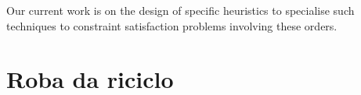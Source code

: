 \documentclass[a4paper]{elsarticle}
\newcommand{\1}{\mathbf{1}}
\def\odiv{{ \ominus\hspace{-8pt}:}\;}
\begin{document}
Our current work is on the design of specific heuristics to specialise such techniques to constraint satisfaction problems involving these orders. 

%
%

%




\section{Roba da riciclo}
\end{document}
